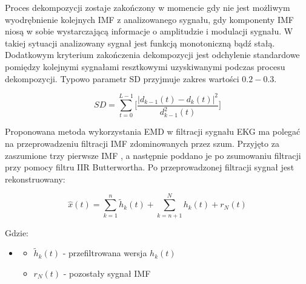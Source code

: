\documentclass[a4paper]{article}
\begin{document}
Proces dekompozycji zostaje zakończony w momencie gdy nie jest możliwym wyodrębnienie kolejnych IMF z analizowanego sygnału, gdy komponenty IMF niosą w sobie wystarczającą informacje o amplitudzie i modulacji sygnału. W takiej sytuacji analizowany sygnał jest funkcją monotoniczną bądź stałą. Dodatkowym kryterium zakończenia dekompozycji jest odchylenie standardowe pomiędzy kolejnymi sygnałami resztkowymi uzyskiwanymi podczas procesu dekompozycji. Typowo parametr SD przyjmuje zakres wartości $0.2 - 0.3$.

\begin{equation}
	SD=\sum_{t=0}^{L-1} \bigg[\frac{|d_{k-1}(t)-d_{k}(t)|^{2}}{d_{k-1}^{2}(t)}\bigg]
 \end{equation}

Proponowana metoda wykorzystania EMD w filtracji sygnału EKG ma polegać na przeprowadzeniu filtracji IMF zdominowanych przez szum. Przyjęto za zaszumione trzy pierwsze IMF \cite{1}, a następnie poddano je po zsumowaniu filtracji przy pomocy filtru IIR Butterwortha.
Po przeprowadzonej filtracji sygnał jest rekonstruowany: 

\begin{equation}
	\hat{x}(t) = \sum_{k=1}^{n} \tilde{h}_{k}(t) + \sum_{k=n+1}^{N}h_{k}(t)+r_{N}(t)
 \end{equation}

Gdzie:
\begin{itemize}
	\item[] 
	\begin{itemize}
	 	\item[] $\tilde{h}_{k}(t)$ - przefiltrowana wersja $h_{k}(t)$
		\item[] $r_{N}(t)$ - pozostały sygnał IMF
	\end{itemize}
\end{itemize}
\end{document}
